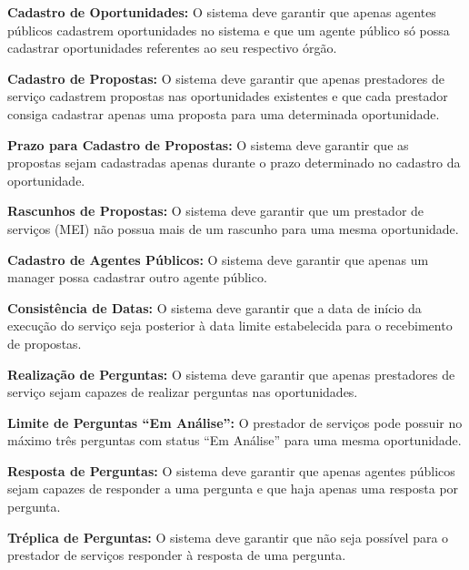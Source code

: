 \begin{description}[noitemsep, topsep=0pt, parsep=0.6pt, leftmargin=1.8cm, labelwidth=1.5cm]
    \item[\label{rn:09}RN09 -] \textbf{Cadastro de Oportunidades:} O sistema deve garantir que apenas agentes públicos cadastrem oportunidades no sistema e que um agente público só possa cadastrar oportunidades referentes ao seu respectivo órgão. 
    
    \item[\label{rn:10}RN10 -] \textbf{Cadastro de Propostas:} O sistema deve garantir que apenas prestadores de serviço cadastrem propostas nas oportunidades existentes e que cada prestador consiga cadastrar apenas uma proposta para uma determinada oportunidade. 
    
    \item[\label{rn:11}RN11 -] \textbf{Prazo para Cadastro de Propostas:} O sistema deve garantir que as propostas sejam cadastradas apenas durante o prazo determinado no cadastro da oportunidade. 
    
    \item[\label{rn:12}RN12 -] \textbf{Rascunhos de Propostas:} O sistema deve garantir que um prestador de serviços (MEI) não possua mais de um rascunho para uma mesma oportunidade. 
    
    \item[\label{rn:13}RN13 -] \textbf{Cadastro de Agentes Públicos:} O sistema deve garantir que apenas um manager possa cadastrar outro agente público. 
    
    \item[\label{rn:14}RN14 -] \textbf{Consistência de Datas:} O sistema deve garantir que a data de início da execução do serviço seja posterior à data limite estabelecida para o recebimento de propostas. 
    
    \item[\label{rn:15}RN15 -] \textbf{Realização de Perguntas:} O sistema deve garantir que apenas prestadores de serviço sejam capazes de realizar perguntas nas oportunidades. 

    \item[\label{rn:16}RN16 -] \textbf{Limite de Perguntas ``Em Análise'':} O prestador de serviços pode possuir no máximo três perguntas com status ``Em Análise'' para uma mesma oportunidade. 

    \item[\label{rn:17}RN17 -] \textbf{Resposta de Perguntas:} O sistema deve garantir que apenas agentes públicos sejam capazes de responder a uma pergunta e que haja apenas uma resposta por pergunta. 

    \item[\label{rn:18}RN18 -] \textbf{Tréplica de Perguntas:} O sistema deve garantir que não seja possível para o prestador de serviços responder à resposta de uma pergunta. 


\end{description}

